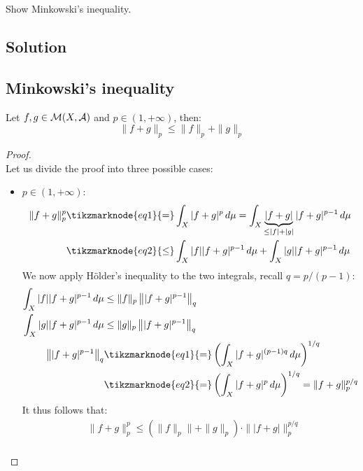 
\question
Show Minkowski's inequality.

\subsection*{Solution}

\subsection{Minkowski's inequality} \label{minkowski}
Let $f,g \in \mathcal{M}(X,\mathcal{A})$ and $p\in(1,+\infty)$, then:
\[ \| f + g \|_p \leq \| f \|_p + \| g \|_p \]

\begin{proof}
    \hspace*{\fill}\\ %
    Let us divide the proof into three possible cases:
    \begin{itemize}
        \item $p\in(1,+\infty)$:
            \begin{align*}
                \|f+g\|_p^p & \tikzmarknode{eq1}{=} \int_X |f+g|^p \, d\mu = \int_X \underbrace{|f+g|}_{\leq |f| + |g|} |f+g|^{p-1} \, d\mu \\
                & \tikzmarknode{eq2}{\leq} \int_X |f| |f+g|^{p-1} \, d\mu + \int_X |g| |f+g|^{p-1} \, d\mu
            \end{align*}
            We now apply Hölder's inequality to the two integrals, recall $q=p/(p-1)$:
            \begin{align*}
                \int_X |f| |f+g|^{p-1} \, d\mu &\leq \|f\|_p \left\| |f+g|^{p-1} \right\|_q \\
                \int_X |g| |f+g|^{p-1} \, d\mu &\leq \|g\|_p \left\| |f+g|^{p-1} \right\|_q \\
                \left\| |f+g|^{p-1} \right\|_q & \tikzmarknode{eq1}{=} \left( \int_X |f+g|^{(p-1)q} \, d\mu \right)^{1/q} \\
                & \tikzmarknode{eq2}{=} \left( \int_X |f+g|^p \, d\mu \right)^{1/q} = \|f+g\|_p^{p/q}
            \end{align*}
            It thus follows that:
            \begin{align*}
                & \|f+g\|_p^p \leq (\|f\|_p\|+\|g\|_p) \cdot \| |f+g| \|_p^{p/q} \\

\end{align*}
\end{itemize}
\end{proof}

